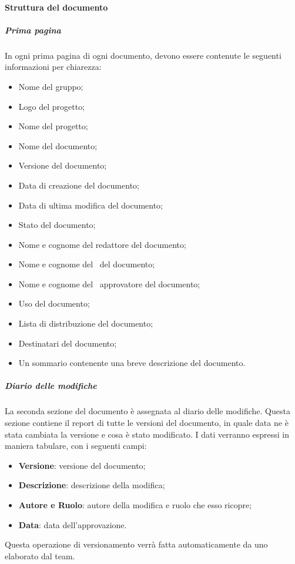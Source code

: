 \documentclass[../NormeDiProgetto_v3.0.0.tex]{subfiles}
\begin{document}
			\paragraph{Struttura del documento}
				\subparagraph{Prima pagina}
				In ogni prima pagina di ogni documento, devono essere contenute le seguenti informazioni per chiarezza:
				\begin{itemize}
				\item Nome del gruppo;
				\item Logo del progetto;
				\item Nome del progetto;
				\item Nome del documento;
				\item Versione del documento;
				\item Data di creazione del documento;
				\item Data di ultima modifica del documento;
				\item Stato del documento;
				\item Nome e cognome del redattore del documento;
				\item Nome e cognome del \verificatore\ del documento;
				\item Nome e cognome del \responsabilediprogetto\ approvatore del documento;
				\item Uso del documento;
				\item Lista di distribuzione del documento;
				\item Destinatari del documento;
				\item Un sommario contenente una breve descrizione del documento.
				\end{itemize}

				\subparagraph{Diario delle modifiche}
				La seconda sezione del documento è assegnata al diario delle modifiche. Questa sezione contiene il report di tutte le versioni del documento, in quale data ne è stata cambiata la versione e cosa è stato modificato. I dati verranno espressi in maniera tabulare, con i seguenti campi:
				\begin{itemize}
				\item \textbf{Versione}: versione del documento;
				\item \textbf{Descrizione}: descrizione della modifica;
				\item \textbf{Autore e Ruolo}: autore della modifica e ruolo che esso ricopre;
				\item \textbf{Data}: data dell'approvazione.
				\end{itemize}
				Questa operazione di versionamento verrà fatta automaticamente da uno   elaborato dal team.
\end{document}
